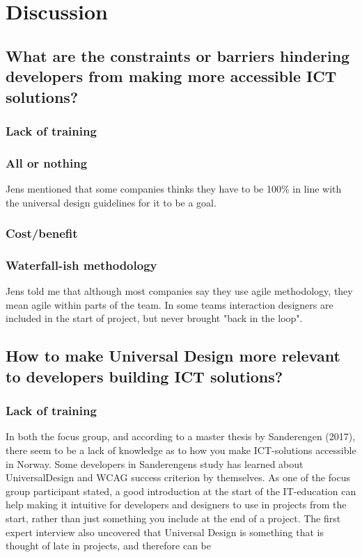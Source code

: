 \chapter{Discussion} \label{discussionchap}

\section{What are the constraints or barriers hindering developers from making more accessible ICT solutions?}
\subsection{Lack of training}
\subsection{All or nothing}
Jens mentioned that some companies thinks they have to be 100\% in line with the universal design guidelines for it to be a goal.

\subsection{Cost/benefit}
\subsection{Waterfall-ish methodology}
Jens told me that although most companies say they use agile methodology, they mean agile within parts of the team. In some teams interaction designers are included in the start of project, but never brought "back in the loop".



\section{How to make Universal Design more relevant to developers building ICT solutions?}
\subsection{Lack of training}
In both the focus group, and according to a master thesis by Sanderengen (2017), there seem to be a lack of knowledge as to how you make ICT-solutions accessible in Norway. Some developers in Sanderengens study has learned about \gls{UniversalDesign} and WCAG success criterion by themselves. As one of the focus group participant stated, a good introduction at the start of the IT-education can help making it intuitive for developers and designers to use in projects from the start, rather than just something you include at the end of a project. The first expert interview also uncovered that Universal Design is something that is thought of late in projects, and therefore can be 

